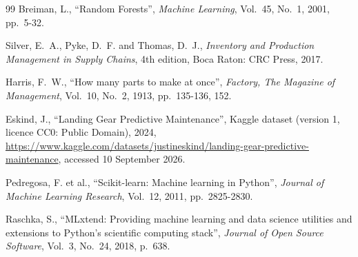 \documentclass[12pt,oneside]{report}
\begin{document}
\begin{singlespace}
\begin{thebibliography}{99}
 Breiman, L., ``Random Forests'', \emph{Machine Learning}, Vol.~45, No.~1, 2001, pp.~5-32.

 Silver, E.~A., Pyke, D.~F. and Thomas, D.~J., \emph{Inventory and Production Management in Supply Chains}, 4th edition, Boca Raton: CRC Press, 2017.

 Harris, F.~W., ``How many parts to make at once'', \emph{Factory, The Magazine of Management}, Vol.~10, No.~2, 1913, pp.~135-136, 152.

 Eskind, J., ``Landing Gear Predictive Maintenance'', Kaggle dataset (version 1, licence CC0: Public Domain), 2024, \url{https://www.kaggle.com/datasets/justineskind/landing-gear-predictive-maintenance}, accessed 10 September 2026.

 Pedregosa, F. et al., ``Scikit-learn: Machine learning in Python'', \emph{Journal of Machine Learning Research}, Vol.~12, 2011, pp.~2825-2830.

 Raschka, S., ``MLxtend: Providing machine learning and data science utilities and extensions to Python's scientific computing stack'', \emph{Journal of Open Source Software}, Vol.~3, No.~24, 2018, p.~638.

\end{thebibliography}
\end{singlespace}

\end{document}
